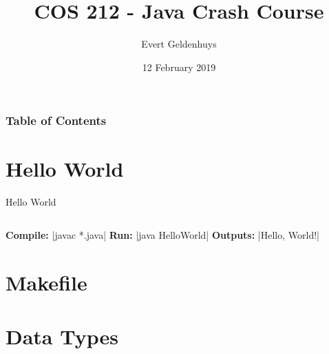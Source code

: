 \documentclass{beamer}
\title{COS 212 - Java Crash Course}
\author{Evert Geldenhuys}
\institute{University of Pretoria}
\date{12 February 2019}
\begin{document}
 
\frame{\titlepage}
 
\begin{frame}
\frametitle{Table of Contents}
\tableofcontents
\end{frame}

\section{Hello World}
\begin{frame}{Hello World}
    \inputminted{java}{HelloWorld.java}
    
    \textbf{Compile:}
    |javac *.java|
    \textbf{Run:}
    |java HelloWorld|
    \textbf{Outputs:}
    |Hello, World!|
\end{frame}

\section{Makefile}
\section{Data Types}
\end{document}
